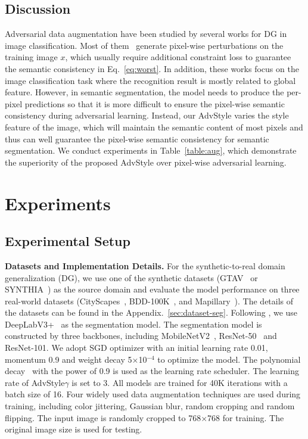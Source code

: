 \documentclass{article}
\newcommand{\ours}{AdvStyle\xspace}
\begin{document}
\subsection{Discussion} 

Adversarial data augmentation have been studied by several works for DG in image classification. Most of them~\cite{qiao2020learning, volpi2018generalizing} generate pixel-wise perturbations on the training image $x$, which usually require additional constraint loss to guarantee the semantic consistency in Eq.~\ref{eq:worst}. In addition, these works focus on the image classification task where the recognition result is mostly related to global feature. However, in semantic segmentation, the model needs to produce the per-pixel predictions so that it is more difficult to ensure the pixel-wise semantic consistency during adversarial learning. Instead, our \ours varies the style feature of the image, which will maintain the semantic content of most pixels and thus can well guarantee the pixel-wise semantic consistency for semantic segmentation. We conduct experiments in Table~\ref{table:aug}, which demonstrate the superiority of the proposed \ours over pixel-wise adversarial learning. 


\section{Experiments}
\label{sec:exp}

\subsection{Experimental Setup}
\label{sec:seg_imple_details}


\textbf{Datasets and Implementation Details.}
For the synthetic-to-real domain generalization (DG), we use one of the synthetic datasets (GTAV~\cite{gtav} or SYNTHIA~\cite{synthia}) as the source domain and evaluate the model performance on three real-world datasets (CityScapes~\cite{CityScapes}, BDD-100K~\cite{bdd}, and Mapillary~\cite{mapillary}).
The details of the datasets can be found in the Appendix.~\ref{sec:dataset-seg}.
Following \cite{robustnet}, we use DeepLabV3+~\cite{deeplab} as the segmentation model. The segmentation model is constructed by three backbones, including MobileNetV2~\cite{sandler2018mobilenetv2}, ResNet-50~\cite{he2016deep} and ResNet-101. We adopt SGD optimizer with an initial learning rate 0.01, momentum 0.9 and weight decay 5$\times$10$^{-4}$ to optimize the model. The polynomial decay~\cite{liu2015parsenet} with the power of 0.9 is used as the learning rate scheduler. The learning rate of \ours $\gamma$ is set to 3. All models are trained for 40K iterations with a batch size of 16. Four widely used data augmentation techniques are used during training, including color jittering, Gaussian blur, random cropping and random flipping. The input image is randomly cropped to 768$\times$768 for training. The original image size is used for testing.
\end{document}
